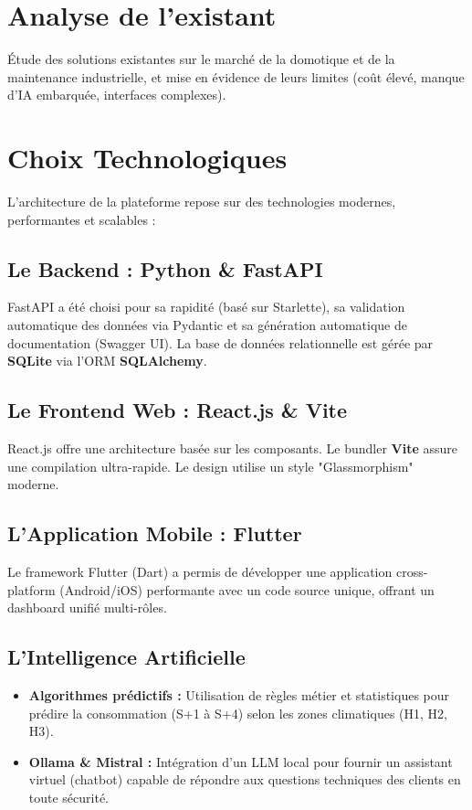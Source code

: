 \documentclass[12pt, a4paper, twoside]{report}
\begin{document}
\section{Analyse de l'existant}
Étude des solutions existantes sur le marché de la domotique et de la maintenance industrielle, et mise en évidence de leurs limites (coût élevé, manque d'IA embarquée, interfaces complexes).

\section{Choix Technologiques}
L'architecture de la plateforme repose sur des technologies modernes, performantes et scalables :

\subsection{Le Backend : Python \& FastAPI}
FastAPI a été choisi pour sa rapidité (basé sur Starlette), sa validation automatique des données via Pydantic et sa génération automatique de documentation (Swagger UI).
La base de données relationnelle est gérée par \textbf{SQLite} via l'ORM \textbf{SQLAlchemy}.

\subsection{Le Frontend Web : React.js \& Vite}
React.js offre une architecture basée sur les composants. Le bundler \textbf{Vite} assure une compilation ultra-rapide. Le design utilise un style "Glassmorphism" moderne.

\subsection{L'Application Mobile : Flutter}
Le framework Flutter (Dart) a permis de développer une application cross-platform (Android/iOS) performante avec un code source unique, offrant un dashboard unifié multi-rôles.

\subsection{L'Intelligence Artificielle}
\begin{itemize}
    \item \textbf{Algorithmes prédictifs :} Utilisation de règles métier et statistiques pour prédire la consommation (S+1 à S+4) selon les zones climatiques (H1, H2, H3).
    \item \textbf{Ollama \& Mistral :} Intégration d'un LLM local pour fournir un assistant virtuel (chatbot) capable de répondre aux questions techniques des clients en toute sécurité.
\end{itemize}
\end{document}
